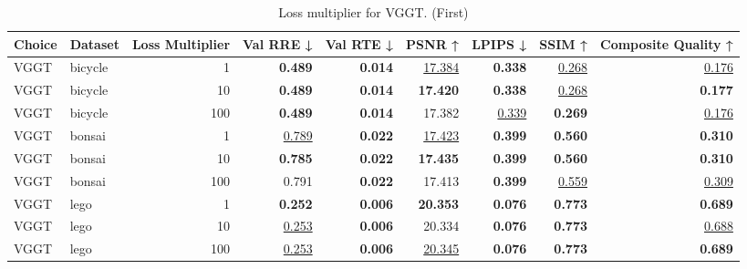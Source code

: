 \begin{table}[H]
\caption{Loss multiplier for VGGT. (First)}
\label{tab:99_loss_multiplier_first}
\centering
\scriptsize
\begin{tabular}{llrrrrrrr}
\toprule
Choice & Dataset & Loss Multiplier & Val RRE ↓ & Val RTE ↓ & PSNR ↑ & LPIPS ↓ & SSIM ↑ & Composite Quality ↑ \\
\midrule
VGGT & bicycle & 1 & \textbf{0.489} & \textbf{0.014} & \underline{17.384} & \textbf{0.338} & \underline{0.268} & \underline{0.176} \\
VGGT & bicycle & 10 & \textbf{0.489} & \textbf{0.014} & \textbf{17.420} & \textbf{0.338} & \underline{0.268} & \textbf{0.177} \\
VGGT & bicycle & 100 & \textbf{0.489} & \textbf{0.014} & 17.382 & \underline{0.339} & \textbf{0.269} & \underline{0.176} \\
\midrule
VGGT & bonsai & 1 & \underline{0.789} & \textbf{0.022} & \underline{17.423} & \textbf{0.399} & \textbf{0.560} & \textbf{0.310} \\
VGGT & bonsai & 10 & \textbf{0.785} & \textbf{0.022} & \textbf{17.435} & \textbf{0.399} & \textbf{0.560} & \textbf{0.310} \\
VGGT & bonsai & 100 & 0.791 & \textbf{0.022} & 17.413 & \textbf{0.399} & \underline{0.559} & \underline{0.309} \\
\midrule
VGGT & lego & 1 & \textbf{0.252} & \textbf{0.006} & \textbf{20.353} & \textbf{0.076} & \textbf{0.773} & \textbf{0.689} \\
VGGT & lego & 10 & \underline{0.253} & \textbf{0.006} & 20.334 & \textbf{0.076} & \textbf{0.773} & \underline{0.688} \\
VGGT & lego & 100 & \underline{0.253} & \textbf{0.006} & \underline{20.345} & \textbf{0.076} & \textbf{0.773} & \textbf{0.689} \\
\bottomrule
\end{tabular}
\end{table}
